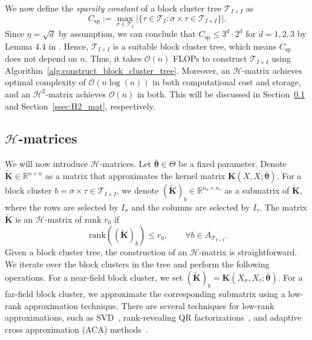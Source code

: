\documentclass[final,3p,times]{elsarticle}
\newcommand{\mc}[1]{\mathcal{#1}}
\renewcommand{\vec}[1]{\boldsymbol{#1}}
\newcommand{\mat}[1]{\boldsymbol{#1}}
\newcommand{\R}{\mathbb{R}}
\newcommand{\mathat}[1]{\widetilde{\boldsymbol{#1}}}
\begin{document}
We now define the \textit{sparsity constant} of a block cluster tree $\mc{T}_{I \times I}$ as
\begin{equation}\label{eqn:csp} C_{\text{sp}} := \max_{\sigma \in \mc{T}_{I} }|\{\tau \in \mc{T}_{I}: \sigma \times \tau \in \mc{T}_{I \times I}  \}|.
\end{equation}
 Since $\eta = \sqrt{d}$ by assumption, we can conclude that $C_{\text{sp}} \le 3^d \cdot 2^{d}$ for $d = 1, 2, 3$ by Lemma 4.4 in \cite{grasedyck2003construction}. Hence,  $\mc{T}_{I \times I}$ is a suitable block cluster tree, which means $C_{\text{sp}}$ does not depend on $n$. Thus, it takes $\mc{O}(n)$ FLOPs to construct $\mc{T}_{I \times I}$ using Algorithm~\ref{alg:construct_block_cluster_tree}. Moreover, an $\mc{H}$-matrix achieves optimal complexity of $\mc{O}(n\log(n))$ in both computational cost and storage, and an $\mc{H}^{2}$-matrix achieves $\mc{O}(n)$ in both. This will be discussed in Section~\ref{ssec:H_mat} and Section~\ref{ssec:H2_mat}, respectively.  




\subsection{\texorpdfstring{$\mc{H}$}{}-matrices}\label{ssec:H_mat}
We will now introduce $\mc{H}$-matrices. Let $\bar{\vec{\theta}} \in \Theta$ be a fixed parameter.
Denote $\mathat{K} \in \R^{n \times n}$ as a matrix that approximates the kernel matrix $\mat{K}({X},{X};\bar{\vec{\theta}})$. For a block cluster $b = \sigma \times \tau \in \mc{T}_{I \times I}$, we denote $(\mathat{K})_b \in \R^{n_{\sigma} \times n_{\tau}}$ as a submatrix of $\mathat{K}$, where the rows are selected by $I_{\sigma}$ and the columns are selected by $I_{\tau}$. The matrix $\mathat{K}$ is an $\mc{H}$-matrix of rank $r_0$ if 
$$ ~ \text{rank}((\mathat{K})_b) \le r_0, \qquad \forall b\in A_{\mc{T}_{I \times I}}.$$
Given a block cluster tree, the construction of an $\mc{H}$-matrix is straightforward. We iterate over the block clusters in the tree and perform the following operations. For a near-field block cluster, we set $(\mathat{K})_b = \mat{K}({X}_\sigma,{X}_\tau;\bar{\vec\theta}).$ For a far-field block cluster, we approximate the corresponding submatrix using a low-rank approximation technique. There are several techniques for low-rank approximations, such as SVD~\cite{eckart1936approximation}, rank-revealing QR factorizations~\cite{gu1996strong_rrqr}, and adaptive cross approximation (ACA) methods~\cite{goreinov1997pseudo_skeleton_approximations,bebendorf2011adaptive_cross_multivariate}.
\end{document}
